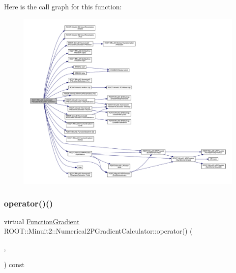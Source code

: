 Here is the call graph for this function\+:
\nopagebreak
\begin{figure}[H]
\begin{center}
\leavevmode
\includegraphics[width=350pt]{d0/d82/classROOT_1_1Minuit2_1_1Numerical2PGradientCalculator_a89c825ba34455277290940fa62fc5321_cgraph}
\end{center}
\end{figure}
\mbox{\label{classROOT_1_1Minuit2_1_1Numerical2PGradientCalculator_a9ca27ef0f61a678b528f32a002e8002b}} 
\subsubsection{\texorpdfstring{operator()()}{operator()()}\hspace{0.1cm}{\footnotesize\ttfamily [8/9]}}
{\footnotesize\ttfamily virtual \mbox{\hyperlink{classROOT_1_1Minuit2_1_1FunctionGradient}{Function\+Gradient}} R\+O\+O\+T\+::\+Minuit2\+::\+Numerical2\+P\+Gradient\+Calculator\+::operator() (\begin{DoxyParamCaption}\item[{const \mbox{\hyperlink{classROOT_1_1Minuit2_1_1MinimumParameters}{Minimum\+Parameters}} \&}]{,  }\item[{const \mbox{\hyperlink{classROOT_1_1Minuit2_1_1FunctionGradient}{Function\+Gradient}} \&}]{ }\end{DoxyParamCaption}) const\hspace{0.3cm}{\ttfamily [virtual]}}



